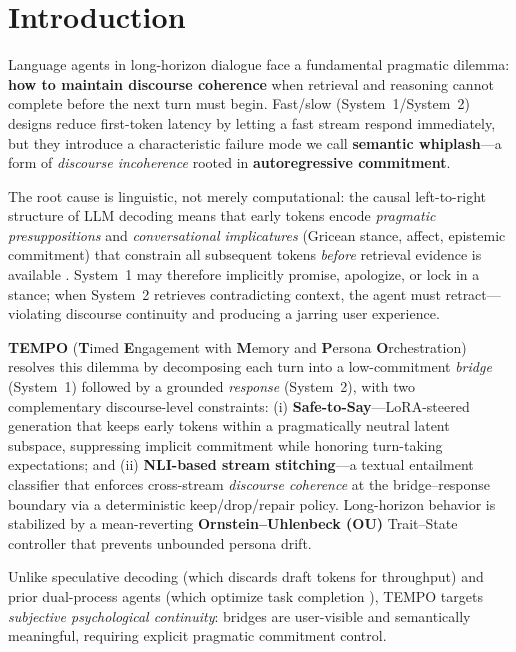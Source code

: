 \documentclass[11pt]{article}
\begin{document}
\section{Introduction}

Language agents in long-horizon dialogue face a fundamental pragmatic dilemma: \textbf{how to maintain discourse coherence} when retrieval and reasoning cannot complete before the next turn must begin. Fast/slow (System~1/System~2) designs reduce first-token latency by letting a fast stream respond immediately, but they introduce a characteristic failure mode we call \textbf{semantic whiplash}---a form of \emph{discourse incoherence} rooted in \textbf{autoregressive commitment}.

The root cause is linguistic, not merely computational: the causal left-to-right structure of LLM decoding means that early tokens encode \emph{pragmatic presuppositions} and \emph{conversational implicatures} (Gricean stance, affect, epistemic commitment) that constrain all subsequent tokens \emph{before} retrieval evidence is available \cite{pandian2025snapout}. System~1 may therefore implicitly promise, apologize, or lock in a stance; when System~2 retrieves contradicting context, the agent must retract---violating discourse continuity and producing a jarring user experience.

\textbf{TEMPO} (\textbf{T}imed \textbf{E}ngagement with \textbf{M}emory and \textbf{P}ersona \textbf{O}rchestration) resolves this dilemma by decomposing each turn into a low-commitment \emph{bridge} (System~1) followed by a grounded \emph{response} (System~2), with two complementary discourse-level constraints: (i) \textbf{Safe-to-Say}---LoRA-steered generation that keeps early tokens within a pragmatically neutral latent subspace, suppressing implicit commitment while honoring turn-taking expectations; and (ii) \textbf{NLI-based stream stitching}---a textual entailment classifier that enforces cross-stream \emph{discourse coherence} at the bridge--response boundary via a deterministic keep/drop/repair policy. Long-horizon behavior is stabilized by a mean-reverting \textbf{Ornstein--Uhlenbeck (OU)} Trait--State controller that prevents unbounded persona drift.

Unlike speculative decoding (which discards draft tokens for throughput) and prior dual-process agents (which optimize task completion \cite{zhang2025dptagent,liu2023hierarchicalagent}), TEMPO targets \emph{subjective psychological continuity}: bridges are user-visible and semantically meaningful, requiring explicit pragmatic commitment control.
\end{document}
